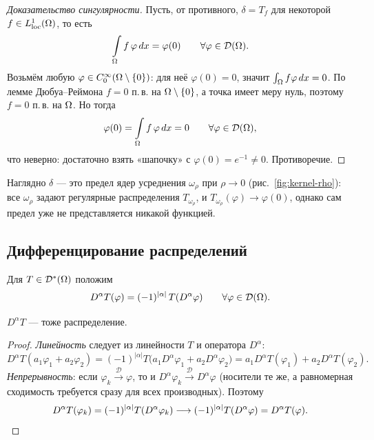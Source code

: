 \begin{proof}[Доказательство сингулярности]
Пусть, от противного, $\delta = T_f$ для некоторой $f \in L^1_{\mathrm{loc}}(\Omega)$, то есть
\[
  \int\limits_\Omega f\,\varphi\, dx = \varphi(0) \qquad \forall \varphi \in \mathcal{D}(\Omega) .
\]
Возьмём любую $\varphi \in C_0^\infty(\Omega \setminus \{0\})$: для неё $\varphi(0) = 0$,
значит $\int_\Omega f \varphi\, dx = 0$. По лемме Дюбуа--Реймона $f = 0$ п.\,в. на
$\Omega \setminus \{0\}$, а точка имеет меру нуль, поэтому $f = 0$ п.\,в. на $\Omega$. Но тогда
\[
  \varphi(0) = \int\limits_\Omega f\,\varphi\, dx = 0 \qquad \forall \varphi \in \mathcal{D}(\Omega) ,
\]
что неверно: достаточно взять «шапочку» с $\varphi(0) = e^{-1} \neq 0$. Противоречие.
\end{proof}

\begin{idea}
Наглядно $\delta$ — это предел ядер усреднения $\omega_\rho$ при $\rho \to 0$
(рис.~\ref{fig:kernel-rho}): все $\omega_\rho$ задают регулярные распределения
$T_{\omega_\rho}$, и $T_{\omega_\rho}(\varphi) \to \varphi(0)$, однако сам предел уже
не представляется никакой функцией.
\end{idea}

\subsection{Дифференцирование распределений}

\begin{definition}
Для $T \in \mathcal{D}^*(\Omega)$ положим
\[
  D^\alpha T(\varphi) = (-1)^{|\alpha|}\, T(D^\alpha \varphi)
  \qquad \forall \varphi \in \mathcal{D}(\Omega) .
\]
\end{definition}

\begin{proposition}[утв.\ 1]\label{prop:deriv-distr}
$D^\alpha T$ — тоже распределение.
\end{proposition}

\begin{proof}
\emph{Линейность} следует из линейности $T$ и оператора $D^\alpha$:
\[
  D^\alpha T(a_1\varphi_1 + a_2\varphi_2)
  = (-1)^{|\alpha|} T\big(a_1 D^\alpha\varphi_1 + a_2 D^\alpha\varphi_2\big)
  = a_1 D^\alpha T(\varphi_1) + a_2 D^\alpha T(\varphi_2) .
\]
\emph{Непрерывность}: если $\varphi_k \xrightarrow{\mathcal{D}} \varphi$, то и
$D^\alpha \varphi_k \xrightarrow{\mathcal{D}} D^\alpha \varphi$ (носители те же, а
равномерная сходимость требуется сразу для всех производных). Поэтому
\[
  D^\alpha T(\varphi_k) = (-1)^{|\alpha|} T(D^\alpha \varphi_k)
  \longrightarrow (-1)^{|\alpha|} T(D^\alpha \varphi) = D^\alpha T(\varphi) . \qedhere
\]
\end{proof}

